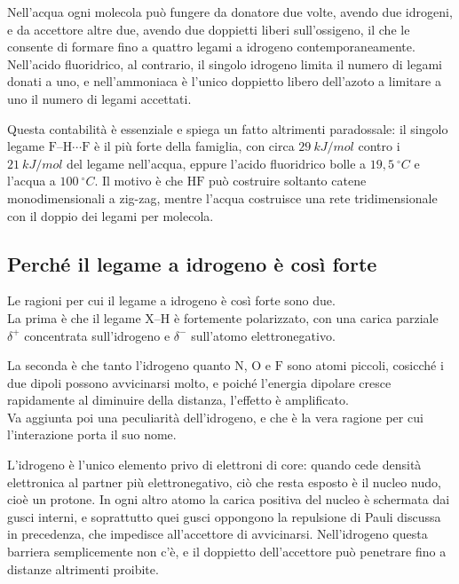 Nell'acqua ogni molecola può fungere da donatore due volte, avendo due idrogeni, e da accettore altre due, avendo due doppietti liberi sull'ossigeno, il che le consente di formare fino a quattro legami a idrogeno contemporaneamente.
Nell'acido fluoridrico, al contrario, il singolo idrogeno limita il numero di legami donati a uno, e nell'ammoniaca è l'unico doppietto libero dell'azoto a limitare a uno il numero di legami accettati.

Questa contabilità è essenziale e spiega un fatto altrimenti paradossale: il singolo legame $\mathrm{F}$--$\mathrm{H}\cdots\mathrm{F}$ è il più forte della famiglia, con circa $29 \ kJ/mol$ contro i $21 \ kJ/mol$ del legame nell'acqua, eppure l'acido fluoridrico bolle a $19,5 \ ^\circ C$ e l'acqua a $100 \ ^\circ C$.
Il motivo è che $\mathrm{HF}$ può costruire soltanto catene monodimensionali a zig-zag, mentre l'acqua costruisce una rete tridimensionale con il doppio dei legami per molecola.
 
\subsection{Perché il legame a idrogeno è così forte}
 
Le ragioni per cui il legame a idrogeno è così forte sono due.\\

La prima è che il legame $\mathrm{X}$--$\mathrm{H}$ è fortemente polarizzato, con una carica parziale $\delta^+$ concentrata sull'idrogeno e $\delta^-$ sull'atomo elettronegativo.

La seconda è che tanto l'idrogeno quanto $\mathrm{N}$, $\mathrm{O}$ e $\mathrm{F}$ sono atomi piccoli, cosicché i due dipoli possono avvicinarsi molto, e poiché l'energia dipolare cresce rapidamente al diminuire della distanza, l'effetto è amplificato.\\

Va aggiunta poi una peculiarità dell'idrogeno, e che è la vera ragione per cui l'interazione porta il suo nome.

L'idrogeno è l'unico elemento privo di elettroni di core: quando cede densità elettronica al partner più elettronegativo, ciò che resta esposto è il nucleo nudo, cioè un protone.
In ogni altro atomo la carica positiva del nucleo è schermata dai gusci interni, e soprattutto quei gusci oppongono la repulsione di Pauli discussa in precedenza, che impedisce all'accettore di avvicinarsi.
Nell'idrogeno questa barriera semplicemente non c'è, e il doppietto dell'accettore può penetrare fino a distanze altrimenti proibite.

